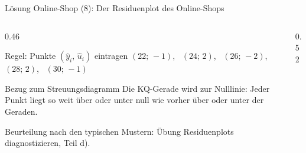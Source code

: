 \documentclass[aspectratio=169,11pt]{beamer}
\def\uebresliste{22/-1,24/2,26/-2,28/2,30/-1}
\newcommand{\residuenplotvon}[2]{%
  \foreach \px/\py in #1 {%
    \edef\tmpdraw{\noexpand\draw[resred!70, line width=1.2pt, #2] (axis cs:\px,0) -- (axis cs:\px,\py);
      \noexpand\fill[hsbiblue, #2] (axis cs:\px,\py) circle[radius=2.2pt];}%
    \tmpdraw
  }}
\begin{document}
\begin{frame}{Lösung Online-Shop (8): Der Residuenplot des Online-Shops}
  \begin{columns}[T]
    \begin{column}{0.46\textwidth}
      \begin{block}{Regel: Punkte $(\hat{y}_i,\,\hat{u}_i)$ eintragen}
        $(22;\,-1)$, \ $(24;\,2)$, \ $(26;\,-2)$, \ $(28;\,2)$, \ $(30;\,-1)$
      \end{block}
      \begin{exampleblock}{Bezug zum Streuungsdiagramm}
        Die KQ-Gerade wird zur Nulllinie: Jeder Punkt liegt so weit über oder
        unter null wie vorher über oder unter der Geraden.
      \end{exampleblock}
      \footnotesize Beurteilung nach den typischen Mustern: Übung
      \glqq Residuenplots diagnostizieren\grqq, Teil d).
    \end{column}
    \begin{column}{0.52\textwidth}
    \end{column}
  \end{columns}
\end{frame}
\end{document}
